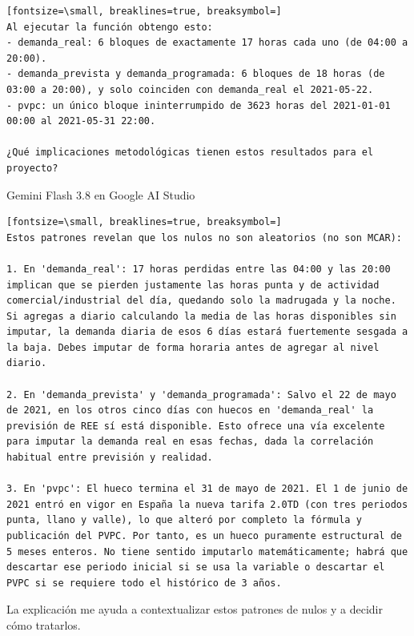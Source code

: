 \documentclass[12pt,a4paper,oneside]{book}
\begin{document}
\begin{iaprompt}
\begin{Verbatim}[fontsize=\small, breaklines=true, breaksymbol=]
Al ejecutar la función obtengo esto:
- demanda_real: 6 bloques de exactamente 17 horas cada uno (de 04:00 a 20:00).
- demanda_prevista y demanda_programada: 6 bloques de 18 horas (de 03:00 a 20:00), y solo coinciden con demanda_real el 2021-05-22.
- pvpc: un único bloque ininterrumpido de 3623 horas del 2021-01-01 00:00 al 2021-05-31 22:00.

¿Qué implicaciones metodológicas tienen estos resultados para el proyecto?
\end{Verbatim}
\end{iaprompt}
\begin{iaresp}{Gemini Flash 3.8 en Google AI Studio}
\begin{Verbatim}[fontsize=\small, breaklines=true, breaksymbol=]
Estos patrones revelan que los nulos no son aleatorios (no son MCAR):

1. En 'demanda_real': 17 horas perdidas entre las 04:00 y las 20:00 implican que se pierden justamente las horas punta y de actividad comercial/industrial del día, quedando solo la madrugada y la noche. Si agregas a diario calculando la media de las horas disponibles sin imputar, la demanda diaria de esos 6 días estará fuertemente sesgada a la baja. Debes imputar de forma horaria antes de agregar al nivel diario.

2. En 'demanda_prevista' y 'demanda_programada': Salvo el 22 de mayo de 2021, en los otros cinco días con huecos en 'demanda_real' la previsión de REE sí está disponible. Esto ofrece una vía excelente para imputar la demanda real en esas fechas, dada la correlación habitual entre previsión y realidad.

3. En 'pvpc': El hueco termina el 31 de mayo de 2021. El 1 de junio de 2021 entró en vigor en España la nueva tarifa 2.0TD (con tres periodos punta, llano y valle), lo que alteró por completo la fórmula y publicación del PVPC. Por tanto, es un hueco puramente estructural de 5 meses enteros. No tiene sentido imputarlo matemáticamente; habrá que descartar ese periodo inicial si se usa la variable o descartar el PVPC si se requiere todo el histórico de 3 años.
\end{Verbatim}
\end{iaresp}
\begin{iaanalisis}
La explicación me ayuda a contextualizar estos patrones de nulos y a decidir cómo tratarlos.
\end{iaanalisis}
\end{document}
